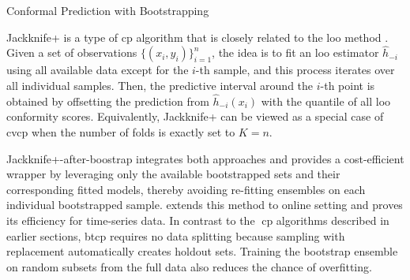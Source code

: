 \documentclass[a4paper,oneside,bibliography=totoc]{scrbook}
\begin{document}
\begin{algorithm}[t]
  \caption{Conformal Prediction with Bootstrapping}
  \label{alg:BtCP}
  \begin{algorithmic}[1]
    \textbf{Input:} 
    A set of observations $\{(x_{i}, y_{i})\}_{i=1}^n$, number of bootstraps $B$, a prediction algorithm $h(\cdot)$, a non-conformity measure $\myfunc{s(\cdot)}$, nominal mis-coverage rate $\tau$, test data $x_{n+1}$. \vskip
    \textbf{Output:} a prediction set $\mathcal{C}_{\tau}(x_{n+1})}$ that covers $y_{n+1}$ with probability $1-\tau$. \vskip
    \vspace{0.5em}
    \STATE Sample all available data with replacement and create $B$ subsets. $I_b$ denotes the indices of data points included in the $b$-th sample.
    \STATE Train $\hat{h}_{b}(\cdot)$ on $\{(x_{i}, y_{i}) \mid i \in I_b\}$ for $b$ in 1, 2, ..., B
    \STATE Initialise a conformity scoring set $S=\emptyset$
    \FOR {$i$ in 1, 2, ..., n}
    	\begin{enumerate}
    		\STATE Initialize an empty for leave-one-out estimates $LOO_i=\emptyset$
    		\STATE For {$b$ in 1, 2, ..., B},  if {$i$ \notin \; $I_b$}\;: $LOO_i \leftarrow{LOO_i \cup \hat{h}_b(x_i)}$ 
			\STATE S \gets S \cup s\big(aggregate(LOO_i),\; y_i\big)
		\end{enumerate}
    \ENDFOR
	\STATE Predict $x_{n+1}$: $h(x_{n+1}) \leftarrow aggregate(\{\hat{h}_{1}(x_{n+1}), ..., \hat{h}_{B}(x_{n+1})\})$ 
	\STATE Return $\mathcal{C}_{\tau}(x_{n+1}) \leftarrow \{y \,|\, s((h(x_{n+1}), y) \leq q\}$, where $q$ is the $\lceil(1-\tau)(n_s+1)\rceil$-th smallest value of $S$, with $n_s = |S|$.
    \end{algorithmic}
\end{algorithm}


Jackknife+ is a type of \gls{cp} algorithm that is closely related to the \gls{loo} method \cite{barber2020jackknife}. Given a set of observations $\{(x_{i}, y_{i})\}_{i=1}^n$, the idea is to fit an \gls{loo} estimator $\hat{h}_{-i}$ using all available data except for the $i$-th sample, and this process iterates over all individual samples. Then, the predictive interval around the $i$-th point is obtained by offsetting the prediction from $\hat{h}_{-i}(x_i)$ with the quantile of all \gls{loo} conformity scores.  Equivalently, Jackknife+ can be viewed as a special case of \gls{cvcp} when the number of folds is exactly set to $K=n$.

Jackknife+-after-boostrap \cite{kim2020predictive} integrates both approaches and provides a cost-efficient wrapper by leveraging only the available bootstrapped sets and their corresponding fitted models, thereby avoiding re-fitting ensembles on each individual bootstrapped sample. \cite{pmlr-v139-xu21h} extends this method to online setting and proves its efficiency for time-series data. In contrast to the \gls{cp} algorithms described in earlier sections, \gls{btcp} requires no data splitting because sampling with replacement automatically creates holdout sets. Training the bootstrap ensemble on random subsets from the full data also reduces the chance of overfitting.
\end{document}
